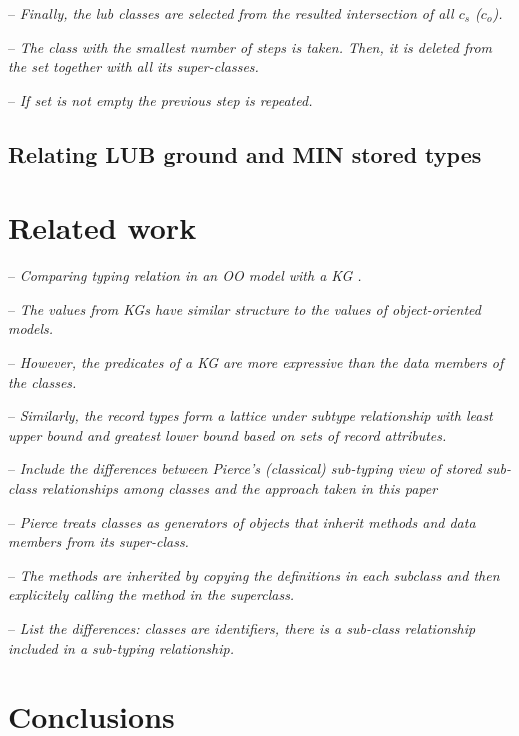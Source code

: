 \documentclass[runningheads]{llncs}
\newcommand{\notes}[1]{\noindent\begin{small}-- \emph{#1}\hfill\break\end{small}}
\begin{document}
\notes{Finally, the lub classes are selected from the resulted intersection of all $c_s$ ($c_o$).}
\notes{The class with the smallest number of steps is taken. Then, it is deleted from the set together with all its super-classes.}
\notes{If set is not empty the previous step is repeated.}



\subsection{Relating LUB ground and MIN stored types}









\section{Related work}

\notes{Comparing typing relation in an OO model with a KG \cite{Pierce2002}.}
\notes{The values from KGs have similar structure to the values of object-oriented models.}
\notes{However, the predicates of a KG are more expressive than the data members of the classes.}
\notes{Similarly, the record types form a lattice under subtype relationship with least upper bound and greatest lower bound based on sets of record attributes.}

\notes{Include the differences between Pierce's (classical) sub-typing view of stored sub-class relationships among classes and the approach taken in this paper}
\notes{Pierce treats classes as generators of objects that inherit methods and data members from its super-class.}
\notes{The methods are inherited by copying the definitions in each subclass and then explicitely calling the method in the superclass.}
\notes{List the differences: classes are identifiers, there is a sub-class relationship included in a sub-typing relationship.}





\section{Conclusions}



%



\end{document}
